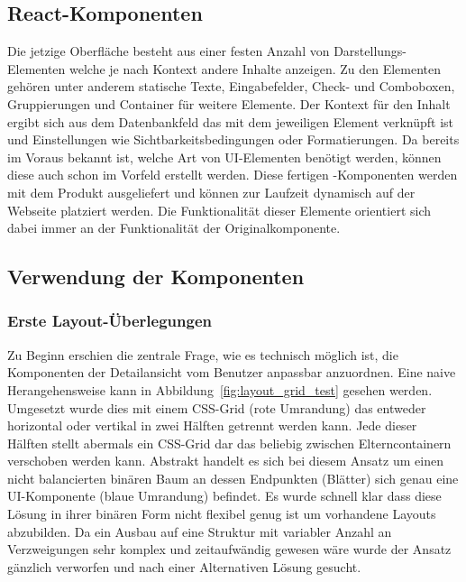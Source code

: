 \subsection{React-Komponenten}
Die jetzige Oberfläche besteht aus einer festen Anzahl von Darstellungs-Elementen welche je nach Kontext andere Inhalte anzeigen. Zu den Elementen gehören unter anderem statische Texte, Eingabefelder, Check- und Comboboxen, Gruppierungen und Container für weitere Elemente. Der Kontext für den Inhalt ergibt sich aus dem Datenbankfeld das mit dem jeweiligen Element verknüpft ist und Einstellungen wie Sichtbarkeitsbedingungen oder Formatierungen. Da bereits im Voraus bekannt ist, welche Art von UI-Elementen benötigt werden, können diese auch schon im Vorfeld erstellt werden. Diese fertigen -Komponenten werden mit dem Produkt ausgeliefert und können zur Laufzeit dynamisch auf der Webseite platziert werden. Die Funktionalität dieser Elemente orientiert sich dabei immer an der Funktionalität der Originalkomponente.

\subsection{Verwendung der Komponenten}
\subsubsection{Erste Layout-Überlegungen}
Zu Beginn erschien die zentrale Frage, wie es technisch möglich ist, die Komponenten der Detailansicht vom Benutzer anpassbar anzuordnen. Eine naive Herangehensweise kann in Abbildung~\ref{fig:layout_grid_test} gesehen werden. Umgesetzt wurde dies mit einem CSS-Grid (rote Umrandung) das entweder horizontal oder vertikal in zwei Hälften getrennt werden kann. Jede dieser Hälften stellt abermals ein CSS-Grid dar das beliebig zwischen Elterncontainern verschoben werden kann. Abstrakt handelt es sich bei diesem Ansatz um einen nicht balancierten binären Baum an dessen Endpunkten (Blätter) sich genau eine UI-Komponente (blaue Umrandung) befindet. Es wurde schnell klar dass diese Lösung in ihrer binären Form nicht flexibel genug ist um vorhandene Layouts abzubilden. Da ein Ausbau auf eine Struktur mit variabler Anzahl an Verzweigungen sehr komplex und zeitaufwändig gewesen wäre wurde der Ansatz gänzlich verworfen und nach einer Alternativen Lösung gesucht. 

